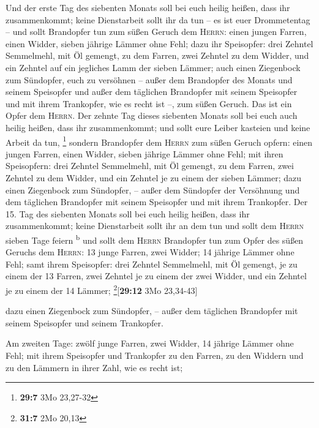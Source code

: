  Und der erste Tag des siebenten Monats soll bei euch
heilig heißen, dass ihr zusammenkommt; keine Dienstarbeit sollt ihr da
tun -- es ist euer Drommetentag --  und sollt Brandopfer
tun zum süßen Geruch dem \textsc{Herrn}: einen jungen Farren, einen
Widder, sieben jährige Lämmer ohne Fehl;  dazu ihr
Speisopfer: drei Zehntel Semmelmehl, mit Öl gemengt, zu dem Farren, zwei
Zehntel zu dem Widder,  und ein Zehntel auf ein jegliches
Lamm der sieben Lämmer;  auch einen Ziegenbock zum
Sündopfer, euch zu versöhnen --  außer dem Brandopfer des
Monats und seinem Speisopfer und außer dem täglichen Brandopfer mit
seinem Speisopfer und mit ihrem Trankopfer, wie es recht ist --, zum
süßen Geruch. Das ist ein Opfer dem \textsc{Herrn}.  Der
zehnte Tag dieses siebenten Monats soll bei euch auch heilig heißen,
dass ihr zusammenkommt; und sollt eure Leiber kasteien und keine Arbeit
da tun, \footnote{\textbf{29:7} 3Mo 23,27-32}  sondern
Brandopfer dem \textsc{Herrn} zum süßen Geruch opfern: einen jungen
Farren, einen Widder, sieben jährige Lämmer ohne Fehl; 
mit ihren Speisopfern: drei Zehntel Semmelmehl, mit Öl gemengt, zu dem
Farren, zwei Zehntel zu dem Widder,  und ein Zehntel je
zu einem der sieben Lämmer;  dazu einen Ziegenbock zum
Sündopfer, -- außer dem Sündopfer der Versöhnung und dem täglichen
Brandopfer mit seinem Speisopfer und mit ihrem Trankopfer.
 Der 15. Tag des siebenten Monats soll bei euch heilig
heißen, dass ihr zusammenkommt; keine Dienstarbeit sollt ihr an dem tun
und sollt dem \textsc{Herrn} sieben Tage feiern \textsuperscript{b}
 und sollt dem \textsc{Herrn} Brandopfer tun zum Opfer
des süßen Geruchs dem \textsc{Herrn}: 13 junge Farren, zwei Widder; 14
jährige Lämmer ohne Fehl;  samt ihrem Speisopfer: drei
Zehntel Semmelmehl, mit Öl gemengt, je zu einem der 13 Farren, zwei
Zehntel je zu einem der zwei Widder,  und ein Zehntel je
zu einem der 14 Lämmer; \footnote{\textbf{31:7} 2Mo 20,13}{[}\textbf{29:12}
3Mo 23,34-43{]}

 dazu einen Ziegenbock zum Sündopfer, -- außer dem
täglichen Brandopfer mit seinem Speisopfer und seinem Trankopfer.

 Am zweiten Tage: zwölf junge Farren, zwei Widder, 14
jährige Lämmer ohne Fehl;  mit ihrem Speisopfer und
Trankopfer zu den Farren, zu den Widdern und zu den Lämmern in ihrer
Zahl, wie es recht ist;

